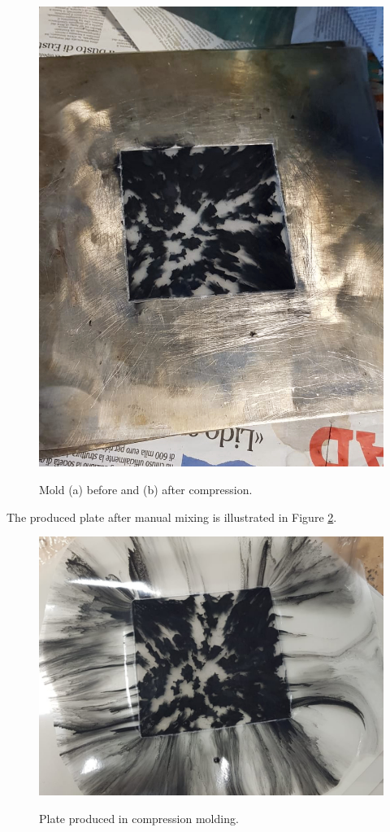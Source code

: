 \documentclass[a4paper, 11pt]{article}
\begin{document}
\begin{figure}[htp]
	{\includegraphics[scale=0.2]{PHOTO-2019-05-23-17-38-6.jpg}}
	\label{fig:beforeafter}
	\caption{Mold (a) before and (b) after compression.}
\end{figure}

The produced plate after manual mixing is illustrated in Figure \ref{fig:plate1}. 

\begin{figure}[htp]
	\centering
	\includegraphics[scale=0.2]
	{PHOTO-2019-05-23-17-38-7.jpg}
	\label{fig:plate1}
	\caption{Plate produced in compression molding.}
\end{figure}
\end{document}
